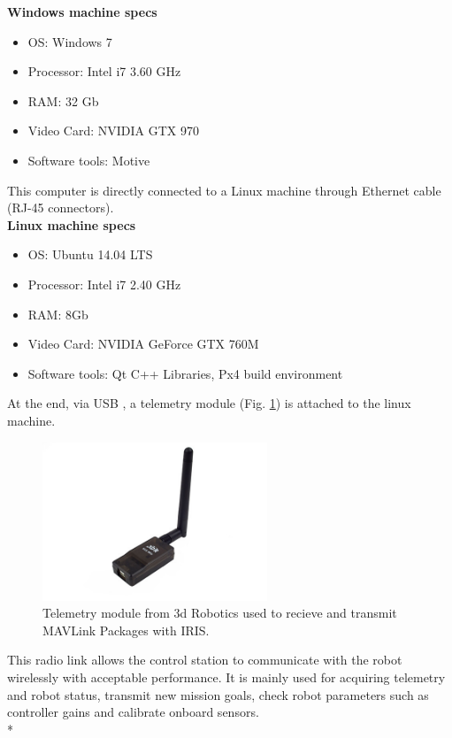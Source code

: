 \noindent
\textbf{Windows machine specs} 
\begin{itemize}

\item OS: Windows 7 
\item Processor: Intel i7 3.60 GHz
\item RAM: 32 Gb
\item Video Card: NVIDIA GTX 970
\item Software tools: Motive

\end{itemize}
This computer is directly connected to a Linux machine through Ethernet cable (RJ-45 connectors). \\

\noindent
\textbf{Linux machine specs} 
\begin{itemize}

\item OS: Ubuntu 14.04 LTS 
\item Processor: Intel i7 2.40 GHz
\item RAM: 8Gb
\item Video Card: NVIDIA GeForce GTX 760M
\item Software tools: Qt C++ Libraries, Px4 build environment \cite{PX4Build}
\end{itemize}
At the end, via USB , a telemetry module (Fig. \ref{figure:telemetry}) is attached to the linux machine.
\begin{figure}[h]
\centering
 \includegraphics[width=0.6\textwidth]{telemetry.jpg}
 \caption[Telemetry module]{Telemetry module from 3d Robotics used to recieve and transmit MAVLink Packages with IRIS.}
 \label{figure:telemetry}
\end{figure}
This radio link allows the control station to communicate with the robot wirelessly with acceptable performance. It is mainly used for acquiring telemetry and robot status, transmit new mission goals, check robot parameters such as controller gains and calibrate onboard sensors. \\*

